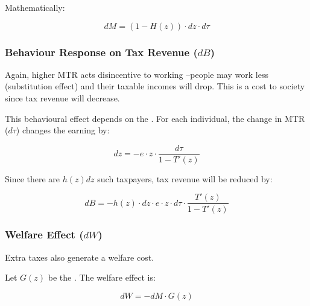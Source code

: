             Mathematically:

            \begin{equation}
                dM = (1-H(z)) \cdot dz \cdot d\tau
                \label{eqn:tax_gen_TR}
            \end{equation}

        \subsubsection{Behaviour Response on Tax Revenue ($dB$)}

            Again, higher MTR acts disincentive to working --people may work less (substitution effect) and their taxable incomes will drop. This is a cost to society since tax revenue will decrease.

            This behavioural effect depends on the . For each individual, the change in MTR ($d\tau$) changes the earning by:

            \begin{equation*}
                dz = -e \cdot z \cdot \frac{d\tau}{1-T'(z)}
            \end{equation*}

            Since there are $h(z)dz$ such taxpayers, tax revenue will be reduced by:

            \begin{equation}
                dB = - h(z) \cdot dz \cdot e \cdot z \cdot d\tau \cdot \frac{T'(z)}{1-T'(z)}
                \label{eqn:tax_gen_BR}
            \end{equation}

        \subsubsection{Welfare Effect ($dW$)}

            Extra taxes also generate a welfare cost.

            Let $G(z)$ be the . The welfare effect is:

            \begin{equation}
                dW = - dM \cdot G(z)
                \label{eqn:tax_gen_WE}
            \end{equation}

